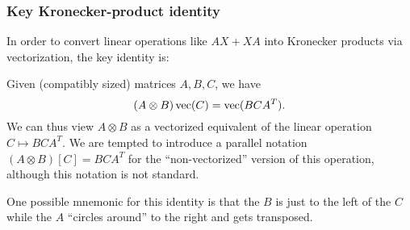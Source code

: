 \subsubsection{Key Kronecker-product identity}

In order to convert linear operations like $AX+XA$ into Kronecker
products via vectorization, the key identity is:

\begin{proposition}\label{prop5000} Given (compatibly sized) matrices
$A,B,C$, we have
\[
(A\otimes B)\operatorname{vec}(C)=\operatorname{vec}(BCA^{T}).
\]
We can thus view $A\otimes B$ as a vectorized equivalent of the linear
operation $C\mapsto BCA^{T}$. We are tempted to introduce a parallel
notation $(A\otimes B)[C]=BCA^{T}$ for the ``non-vectorized'' version
of this operation, although this notation is not standard.

One possible mnemonic for this identity is that
the $B$ is just to the left of the $C$ while the $A$ ``circles around'' to the right and gets transposed.
\end{proposition}

